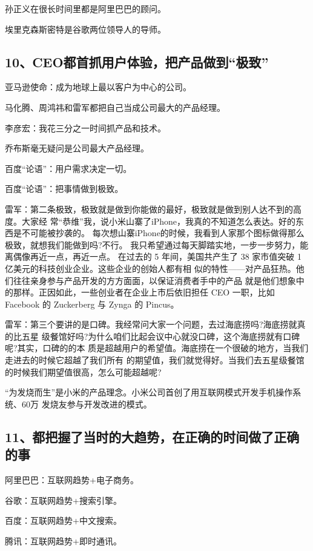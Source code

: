 \documentclass[11pt]{ctexart}
\begin{document}
{{{{孙正义在很长时间里都是阿里巴巴的顾问。

埃里克森斯密特是谷歌两位领导人的导师。

\subsection{10、CEO都首抓用户体验，把产品做到“极致”}
\label{sec:org8e56292}

亚马逊使命：成为地球上最以客户为中心的公司。

马化腾、周鸿祎和雷军都把自己当成公司最大的产品经理。

李彦宏：我花三分之一时间抓产品和技术。

乔布斯毫无疑问是公司最大产品经理。

百度“论语”：用户需求决定一切。

百度“论语”：把事情做到极致。

雷军：第二条极致，极致就是做到你能做的最好，极致就是做到别人达不到的高度。大家经
常“恭维”我，说小米山寨了iPhone，我真的不知道怎么表达。好的东西是不可能被抄袭的。
每次想山寨iPhone的时候，我看到人家那个图标做得那么极致，就想我们能做到吗?不行。
我只希望通过每天脚踏实地，一步一步努力，能离偶像再近一点，再近一点。 在过去的 5
年间，美国共产生了 38 家市值突破 1 亿美元的科技创业企业。这些企业的创始人都有相
似的特性——对产品狂热。他们往往亲身参与产品开发的方方面面，以保证消费者手中的产品
就是他们想象中的那样。正因如此，一些创业者在企业上市后依旧担任 CEO 一职，比如
Facebook 的 Zuckerberg 与 Zynga 的 Pincus。

雷军：第三个要讲的是口碑。我经常问大家一个问题，去过海底捞吗?海底捞就真的比五星
级餐馆好吗?为什么咱们比起会议中心就没口碑，这个海底捞就有口碑呢?其实，口碑的的本
质是超越用户的希望值。海底捞在一个很破的地方，当我们走进去的时候它超越了我们所有
的期望值，我们就觉得好。当我们去五星级餐馆的时候我们期望值很高，怎么可能超越呢?

“为发烧而生”是小米的产品理念。小米公司首创了用互联网模式开发手机操作系统、60万
发烧友参与开发改进的模式。

\subsection{11、都把握了当时的大趋势，在正确的时间做了正确的事}
\label{sec:org85d9dd1}

阿里巴巴：互联网趋势+电子商务。

谷歌：互联网趋势+搜索引擎。

百度：互联网趋势+中文搜索。

腾讯：互联网趋势+即时通讯。

}}}}
\end{document}
